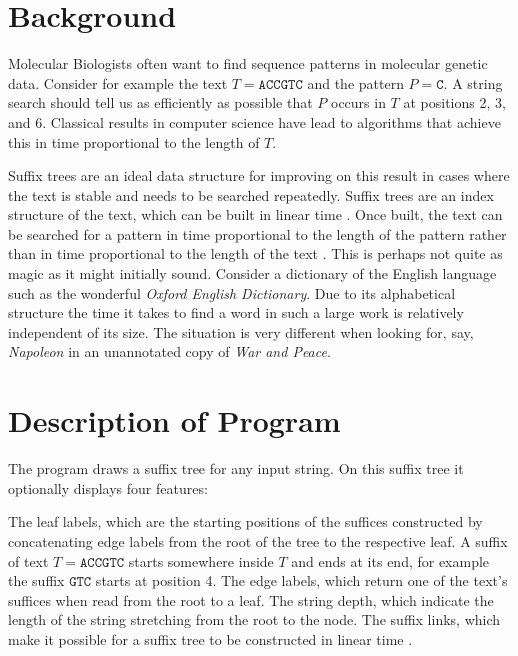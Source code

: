 \section{Background}
Molecular Biologists often want to find sequence patterns in molecular
genetic data. Consider for example the text
$T=\mathtt{ACCGTC}$ and the pattern $P=\mathtt{C}$. A string search
should tell us as efficiently as possible that $P$ occurs in $T$ at
positions 2, 3, and 6. Classical results in computer science have lead
to algorithms that achieve this in time proportional to the length of $T$.

Suffix trees are an ideal data structure for improving on this result in cases
where the text is stable and needs to be searched repeatedly. Suffix
trees are an index structure of the text, which can be built in linear
time \cite{ukk95:alg}. Once built, the text can be searched for
a pattern in time 
proportional to the length of the pattern rather than in time
proportional to the length of the text \cite{gus97:alg}. This is
perhaps not quite as magic as it might initially sound. Consider a
dictionary of the English language such as the wonderful \textit{Oxford English 
  Dictionary}.  Due to its alphabetical structure the
time it takes to find a word in such a large work is relatively independent of its
size. The situation is very different when looking
for, say, \textit{Napoleon} in an unannotated copy of \textit{War and Peace}.

\section{Description of Program}
The program draws a suffix tree for any input string. On this suffix
tree it optionally displays four features:
\begin{enumerate}
  \I The leaf labels, which are the starting positions of the suffices
  constructed by concatenating edge labels from the root of the tree
  to the respective leaf. A suffix of text $T=\mathtt{ACCGTC}$ starts
  somewhere inside $T$ and ends at its end, for example the suffix
  $\mathtt{GTC}$ starts at position 4.
  \I The edge labels, which return one of the text's suffices when read
  from the root to a leaf.
  \I The string depth, which indicate the length of the string
  stretching from the root to the node.
  \I The suffix links, which make it possible for a suffix tree to be
  constructed in linear time \cite{ukk95:alg,gus97:alg}.
\end{enumerate}

